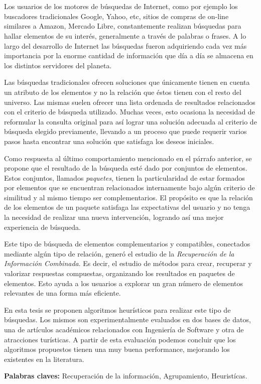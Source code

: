 \chapter*{\runtitulo}

\noindent 

Los usuarios de los motores de búsquedas de Internet, como por ejemplo los buscadores tradicionales Google, Yahoo, etc, sitios de compras de on-line similares a Amazon, Mercado Libre, constantemente realizan búsquedas para hallar elementos de su interés, generalmente a través de palabras o frases. A lo largo del desarrollo de Internet las búsquedas fueron adquiriendo cada vez más importancia por la enorme cantidad de información que día a día se almacena en los distintos servidores del planeta.

Las búsquedas tradicionales ofrecen soluciones que únicamente tienen en cuenta un atributo de los elementos y no la relación que éstos tienen con el resto del universo. Las mismas suelen ofrecer una lista ordenada de resultados relacionados con el criterio de búsqueda utilizado. Muchas veces, esto ocasiona la necesidad de reformular la consulta original para así lograr una solución adecuada al criterio de búsqueda elegido previamente, llevando a un proceso que puede requerir varios pasos hasta encontrar una solución que satisfaga los deseos iniciales.

Como respuesta al último comportamiento mencionado en el párrafo anterior, se propone que el resultado de la búsqueda esté dado por conjuntos de elementos. Estos conjuntos, llamados {\em paquetes}, tienen la particularidad de estar formados por elementos que se encuentran relacionados internamente bajo algún criterio de similitud y al mismo tiempo ser complementarios. El propósito es que la relación de los elementos de un paquete satisfaga las expectativas del usuario y no tenga la necesidad de realizar una nueva intervención, logrando así una mejor experiencia de búsqueda.

Este tipo de búsqueda de elementos complementarios y compatibles, conectados mediante algún tipo de relación, generó el estudio de la {\em Recuperación de la Información Combinada}. Es decir, el estudio de métodos para crear, recuperar y valorizar respuestas compuestas, organizando los resultados en paquetes de elementos. Esto ayuda a los usuarios a explorar un gran número de elementos relevantes de una forma más eficiente.

En esta tesis se proponen algoritmos heurísticos para realizar este tipo de búsquedas. Los mismos son experimentalmente evaluados en dos bases de datos, una de artículos académicos relacionados con Ingeniería de Software y otra de atracciones turísticas. A partir de esta evaluación podemos concluir que los algoritmos propuestos tienen una muy buena performance, mejorando los existentes en la literatura.
\bigskip


\noindent\textbf{Palabras claves:} Recuperación de la información, Agrupamiento, Heuristícas.
